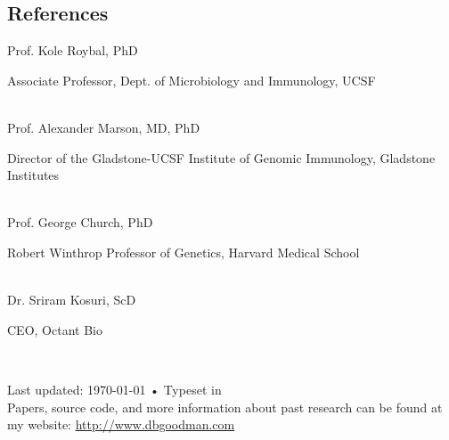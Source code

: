 \documentclass[11pt, letterpaper]{article}
\newif\ifShowContactInfo
\newcommand{\years}[1]{\marginnote{\scriptsize #1}}
\begin{document}
\begin{samepage}
\section*{References}
\noindent

\noindent\years{ }Prof. Kole Roybal, PhD\\ 
{\footnotesize Associate Professor, Dept. of Microbiology and Immunology, UCSF
\ifShowContactInfo
    \\ Phone: \texttt{1-415-476-8289}\\
    email: \href{mailto:kole.roybal@ucsf.edu}{kole.roybal@ucsf.edu}
\fi
}\\

\noindent\years{ }Prof. Alexander Marson, MD, PhD\\ 
{\footnotesize Director of the Gladstone-UCSF Institute of Genomic Immunology, Gladstone Institutes
\ifShowContactInfo
    \\ Phone: \texttt{1-415-502-2611}\\
    email: \href{mailto:alexander.marson@ucsf.edu}{alexander.marson@ucsf.edu}
\fi
}\\


\noindent\years{ }Prof. George Church, PhD\\ 
{\footnotesize Robert Winthrop Professor of Genetics, Harvard Medical School
\ifShowContactInfo
    \\ Phone: \texttt{1-617-432-7562}\\
    email: \href{mailto:gchurch@genetics.med.harvard.edu}{gchurch@genetics.med.harvard.edu}
\fi
}\\



\noindent\years{ }Dr. Sriram Kosuri, ScD\\ 
{\footnotesize CEO, Octant Bio
\ifShowContactInfo
    \\ Phone: \texttt{1-617-852-4806}\\
    email: \href{mailto:sri@octant.bio}{sri@octant.bio}
\fi
}\\

\end{samepage}

\begin{center}
{\scriptsize  Last updated: \today\- •\- Typeset in \href{http://nitens.org/taraborelli/cvtex}{
\XeTeX }\\
Papers, source code, and more information about past
research can be found at my website:
\href{http://www.dbgoodman.com}{http://www.dbgoodman.com}}
\end{center}



% 
\end{document}
